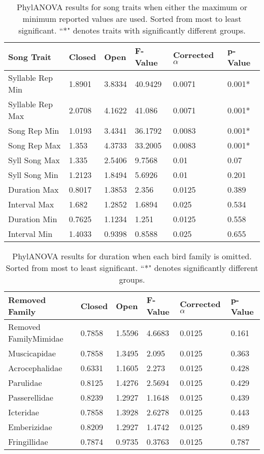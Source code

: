 \documentclass[a4paper,12pt]{article}
\begin{document}
\beginsupplement


\begin{table}[ht]
\caption{PhylANOVA results for song traits when either the maximum or minimum reported values are used.  Sorted from most to least significant.  ``*" denotes traits with significantly different groups.}
\centering
\begin{tabular}{llllll}
  \hline
Song Trait & Closed & Open & F-Value & Corrected $\alpha$ & p-Value \\ 
  \hline
Syllable Rep Min & 1.8901 & 3.8334 & 40.9429 & 0.0071 & 0.001* \\ 
  Syllable Rep Max & 2.0708 & 4.1622 & 41.086 & 0.0071 & 0.001* \\ 
  Song Rep Min & 1.0193 & 3.4341 & 36.1792 & 0.0083 & 0.001* \\ 
  Song Rep Max & 1.353 & 4.3733 & 33.2005 & 0.0083 & 0.001* \\ 
  Syll Song Max & 1.335 & 2.5406 & 9.7568 & 0.01 & 0.07 \\ 
  Syll Song Min & 1.2123 & 1.8494 & 5.6926 & 0.01 & 0.201 \\ 
  Duration Max & 0.8017 & 1.3853 & 2.356 & 0.0125 & 0.389 \\ 
  Interval Max & 1.682 & 1.2852 & 1.6894 & 0.025 & 0.534 \\ 
  Duration Min & 0.7625 & 1.1234 & 1.251 & 0.0125 & 0.558 \\ 
  Interval Min & 1.4033 & 0.9398 & 0.8588 & 0.025 & 0.655 \\ 
   \hline
\end{tabular}
\end{table}

\begin{table}[ht]
\centering
\caption{PhylANOVA results for duration when each bird family is omitted.  Sorted from most to least significant.  ``*" denotes significantly different groups.}
\begin{tabular}{llllll}
  \hline
Removed Family & Closed & Open & F-Value & Corrected $\alpha$ & p-Value \\ 
  \hline
Removed FamilyMimidae & 0.7858 & 1.5596 & 4.6683 & 0.0125 & 0.161 \\ 
  Muscicapidae & 0.7858 & 1.3495 & 2.095 & 0.0125 & 0.363 \\ 
  Acrocephalidae & 0.6331 & 1.1605 & 2.273 & 0.0125 & 0.428 \\ 
  Parulidae & 0.8125 & 1.4276 & 2.5694 & 0.0125 & 0.429 \\ 
  Passerellidae & 0.8239 & 1.2927 & 1.1648 & 0.0125 & 0.439 \\ 
  Icteridae & 0.7858 & 1.3928 & 2.6278 & 0.0125 & 0.443 \\ 
  Emberizidae & 0.8209 & 1.2927 & 1.4742 & 0.0125 & 0.489 \\ 
  Fringillidae & 0.7874 & 0.9735 & 0.3763 & 0.0125 & 0.787 \\ 
   \hline
\end{tabular}
\end{table}
\end{document}
